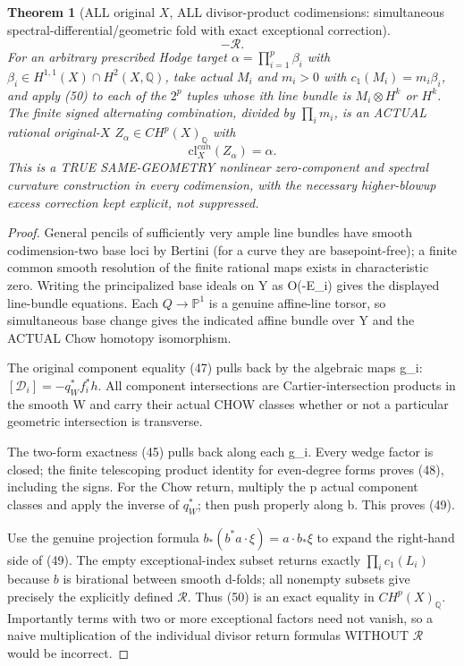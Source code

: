 \documentclass[11pt]{article}
\newtheorem{theorem}{Theorem}[section]
\begin{document}
\begin{theorem}[ALL original $X$, ALL divisor-product codimensions:
simultaneous spectral-differential/geometric fold with exact exceptional correction]
\[{   -\mathcal R.
 }                                            \tag{50}
\]
For an arbitrary prescribed Hodge target
$\alpha=\prod_{i=1}^p\beta_i$ with
$\beta_i\in H^{1,1}(X)\cap H^2(X,\mathbb Q)$,
take actual $M_i$ and $m_i>0$ with
$c_1(M_i)=m_i\beta_i$,
and apply (50) to each of the
$2^p$ tuples whose ith line bundle is
$M_i\otimes H^k$ or $H^k$.
The finite signed alternating combination,
divided by $\prod_i m_i$,
is an ACTUAL rational original-$X$
$Z_\alpha\in CH^p(X)_{\mathbb Q}$ with
\[
 \boxed{\mathrm{cl}^{can}_X(Z_\alpha)=\alpha.}\tag{51}
\]
This is a TRUE SAME-GEOMETRY
nonlinear zero-component and
spectral curvature construction in
every codimension, with the necessary
higher-blowup excess correction kept
explicit, not suppressed.
\end{theorem}
\begin{proof}
General pencils of sufficiently
very ample line bundles have smooth
codimension-two base loci by Bertini
(for a curve they are basepoint-free);
a finite common smooth resolution
of the finite rational maps exists
in characteristic zero. Writing the
principalized base ideals on Y
as O(-E_i) gives the displayed
line-bundle equations.
Each $Q\to\mathbb P^1$ is a genuine
affine-line torsor, so simultaneous
base change gives the indicated
affine bundle over Y and the ACTUAL
Chow homotopy isomorphism.

The original component equality (47)
pulls back by the algebraic maps g_i:
$[\mathcal D_i]=-q_W^*f_i^*h$.
All component intersections are
Cartier-intersection products in
the smooth W and carry their actual
CHOW classes whether or not a
particular geometric intersection
is transverse.

The two-form exactness (45) pulls
back along each g_i.
Every wedge factor is closed;
the finite telescoping product
identity for even-degree forms
proves (48), including the signs.
For the Chow return, multiply the p
actual component classes and apply
the inverse of $q_W^*$; then push
properly along b. This proves (49).

Use the genuine projection formula
$b_*(b^*a\cdot\xi)=a\cdot b_*\xi$
to expand the right-hand side of
(49). The empty exceptional-index
subset returns exactly
$\prod_i c_1(L_i)$ because $b$
is birational between smooth
d-folds; all nonempty subsets
give precisely the explicitly
defined $\mathcal R$.
Thus (50) is an exact equality in
$CH^p(X)_{\mathbb Q}$.
Importantly terms with two or more
exceptional factors need not vanish,
so a naive multiplication of the
individual divisor return formulas
WITHOUT $\mathcal R$ would be
incorrect.


\end{proof}
\end{document}
